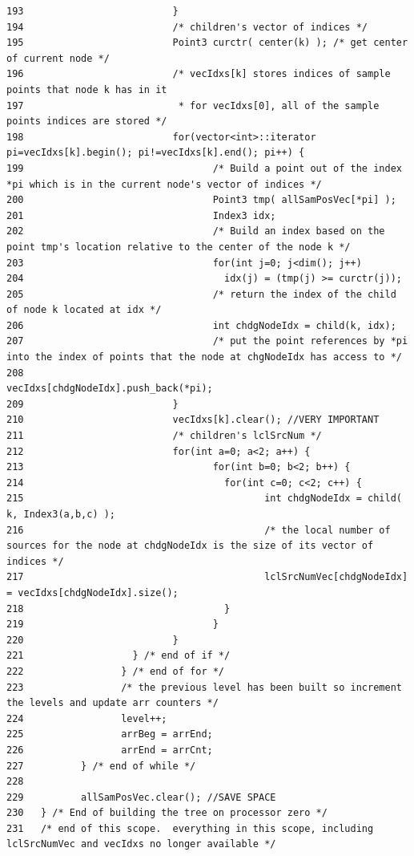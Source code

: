 \begin{verbatim}
193                          }
194                          /* children's vector of indices */ 
195                          Point3 curctr( center(k) ); /* get center of current node */
196                          /* vecIdxs[k] stores indices of sample points that node k has in it
197                           * for vecIdxs[0], all of the sample points indices are stored */
198                          for(vector<int>::iterator pi=vecIdxs[k].begin(); pi!=vecIdxs[k].end(); pi++) {
199                                 /* Build a point out of the index *pi which is in the current node's vector of indices */
200                                 Point3 tmp( allSamPosVec[*pi] );
201                                 Index3 idx;
202                                 /* Build an index based on the point tmp's location relative to the center of the node k */
203                                 for(int j=0; j<dim(); j++)
204                                   idx(j) = (tmp(j) >= curctr(j));
205                                 /* return the index of the child of node k located at idx */
206                                 int chdgNodeIdx = child(k, idx);
207                                 /* put the point references by *pi into the index of points that the node at chgNodeIdx has access to */
208                                 vecIdxs[chdgNodeIdx].push_back(*pi);
209                          }
210                          vecIdxs[k].clear(); //VERY IMPORTANT
211                          /* children's lclSrcNum */
212                          for(int a=0; a<2; a++) {
213                                 for(int b=0; b<2; b++) {
214                                   for(int c=0; c<2; c++) {
215                                          int chdgNodeIdx = child( k, Index3(a,b,c) );
216                                          /* the local number of sources for the node at chdgNodeIdx is the size of its vector of indices */
217                                          lclSrcNumVec[chdgNodeIdx] = vecIdxs[chdgNodeIdx].size();
218                                   }
219                                 } 
220                          }
221                   } /* end of if */
222                 } /* end of for */
223                 /* the previous level has been built so increment the levels and update arr counters */
224                 level++;
225                 arrBeg = arrEnd;
226                 arrEnd = arrCnt;
227          } /* end of while */
228          
229          allSamPosVec.clear(); //SAVE SPACE
230   } /* End of building the tree on processor zero */
231   /* end of this scope.  everything in this scope, including lclSrcNumVec and vecIdxs no longer available */

\end{verbatim}
